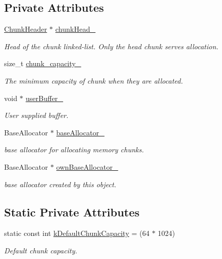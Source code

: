 \subsection*{Private Attributes}
\begin{DoxyCompactItemize}
\item 
\mbox{\hyperlink{structrapidjson_1_1_memory_pool_allocator_1_1_chunk_header}{Chunk\+Header}} $\ast$ \mbox{\hyperlink{classrapidjson_1_1_memory_pool_allocator_a64acbd6f74dd8757baa2a9f6b5841400}{chunk\+Head\+\_\+}}
\begin{DoxyCompactList}\small\item\em Head of the chunk linked-\/list. Only the head chunk serves allocation. \end{DoxyCompactList}\item 
size\+\_\+t \mbox{\hyperlink{classrapidjson_1_1_memory_pool_allocator_a5de12903a376ea7128e65890a287050c}{chunk\+\_\+capacity\+\_\+}}
\begin{DoxyCompactList}\small\item\em The minimum capacity of chunk when they are allocated. \end{DoxyCompactList}\item 
void $\ast$ \mbox{\hyperlink{classrapidjson_1_1_memory_pool_allocator_a3d705851c08a78cbf6ab35d9bcdef010}{user\+Buffer\+\_\+}}
\begin{DoxyCompactList}\small\item\em User supplied buffer. \end{DoxyCompactList}\item 
Base\+Allocator $\ast$ \mbox{\hyperlink{classrapidjson_1_1_memory_pool_allocator_ae9f3a3ea9e2baaeb7c4412268ca88efc}{base\+Allocator\+\_\+}}
\begin{DoxyCompactList}\small\item\em base allocator for allocating memory chunks. \end{DoxyCompactList}\item 
Base\+Allocator $\ast$ \mbox{\hyperlink{classrapidjson_1_1_memory_pool_allocator_afc4427c123458c4a2b5a03319e038788}{own\+Base\+Allocator\+\_\+}}
\begin{DoxyCompactList}\small\item\em base allocator created by this object. \end{DoxyCompactList}\end{DoxyCompactItemize}
\subsection*{Static Private Attributes}
\begin{DoxyCompactItemize}
\item 
static const int \mbox{\hyperlink{classrapidjson_1_1_memory_pool_allocator_aeee1e169678a23611887feded99007a2}{k\+Default\+Chunk\+Capacity}} = (64 $\ast$ 1024)
\begin{DoxyCompactList}\small\item\em Default chunk capacity. \end{DoxyCompactList}\end{DoxyCompactItemize}


